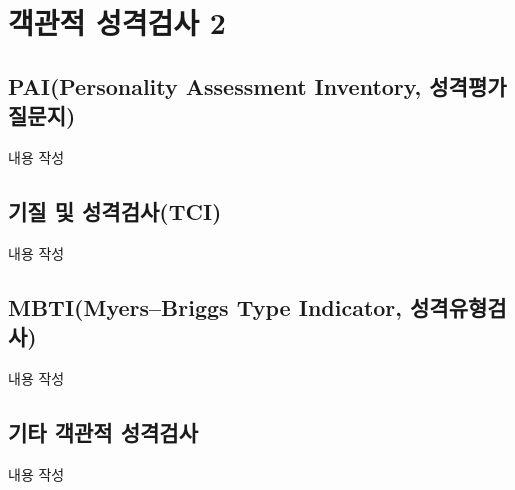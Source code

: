 \section{객관적 성격검사 2}

\subsection{PAI(Personality Assessment Inventory, 성격평가 질문지)}
내용 작성

\subsection{기질 및 성격검사(TCI)}
내용 작성

\subsection{MBTI(Myers–Briggs Type Indicator, 성격유형검사)}
내용 작성

\subsection{기타 객관적 성격검사}
내용 작성
